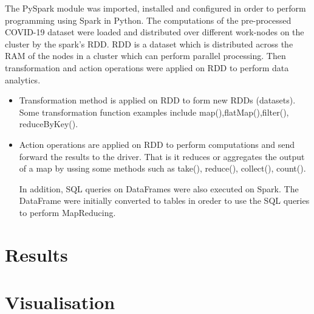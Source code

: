 \documentclass[12pt,letterpaper, twoside]{article}
\begin{document}
The PySpark module was imported, installed and configured in order to perform programming using Spark in Python. The computations of the pre-processed  COVID-19 dataset were loaded and  distributed over different work-nodes on the cluster by the spark's RDD. RDD is a dataset which is distributed across the RAM of the nodes in a cluster  which can perform parallel processing. Then transformation and action operations were applied on RDD to perform data analytics. 
\begin{itemize}
    \item Transformation method is applied on RDD to form new RDDs (datasets). Some transformation function examples include map(),flatMap(),filter(), reduceByKey(). 
    \item Action operations are applied on RDD to perform computations and send forward the results to the driver. That is it reduces or aggregates the output of a map by ussing some methods such as take(), reduce(), collect(), count().
    
In addition, SQL queries on DataFrames were also executed on Spark. The DataFrame were initially converted to tables in oreder to use the SQL queries to perform MapReducing. 

\end{itemize}




\section{Results}
\section{Visualisation}
\end{document}
